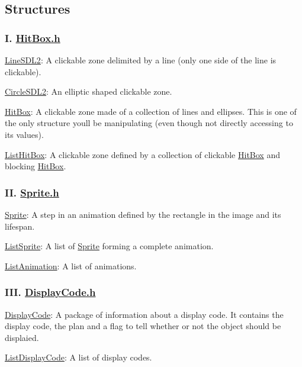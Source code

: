 \subsection*{Structures}

\subsubsection*{I. \hyperlink{HitBox_8h}{Hit\+Box.\+h}}


\begin{DoxyEnumerate}
\item \hyperlink{structLineSDL2}{Line\+S\+D\+L2}\+: A clickable zone delimited by a line (only one side of the line is clickable).
\item \hyperlink{structCircleSDL2}{Circle\+S\+D\+L2}\+: An elliptic shaped clickable zone.
\item \hyperlink{structHitBox}{Hit\+Box}\+: A clickable zone made of a collection of lines and ellipses. This is one of the only structure you\textquotesingle{}ll be manipulating (even though not directly accessing to its values).
\item \hyperlink{structListHitBox}{List\+Hit\+Box}\+: A clickable zone defined by a collection of clickable \hyperlink{structHitBox}{Hit\+Box} and blocking \hyperlink{structHitBox}{Hit\+Box}.
\end{DoxyEnumerate}

\subsubsection*{II. \hyperlink{Sprite_8h}{Sprite.\+h}}


\begin{DoxyEnumerate}
\item \hyperlink{structSprite}{Sprite}\+: A step in an animation defined by the rectangle in the image and its lifespan.
\item \hyperlink{structListSprite}{List\+Sprite}\+: A list of \hyperlink{structSprite}{Sprite} forming a complete animation.
\item \hyperlink{structListAnimation}{List\+Animation}\+: A list of animations.
\end{DoxyEnumerate}

\subsubsection*{I\+II. \hyperlink{DisplayCode_8h}{Display\+Code.\+h}}


\begin{DoxyEnumerate}
\item \hyperlink{structDisplayCode}{Display\+Code}\+: A package of information about a display code. It contains the display code, the plan and a flag to tell whether or not the object should be displaied.
\item \hyperlink{structListDisplayCode}{List\+Display\+Code}\+: A list of display codes.
\end{DoxyEnumerate}

